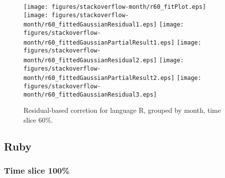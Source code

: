 \begin{figure}[t]
\centering
{}
{\texttt{[image: figures/stackoverflow-month/r60\_fitPlot.eps]}}
{\texttt{[image: figures/stackoverflow-month/r60\_fittedGaussianResidual1.eps]}}
{\texttt{[image: figures/stackoverflow-month/r60\_fittedGaussianPartialResult1.eps]}}
{\texttt{[image: figures/stackoverflow-month/r60\_fittedGaussianResidual2.eps]}}
{\texttt{[image: figures/stackoverflow-month/r60\_fittedGaussianPartialResult2.eps]}}
{\texttt{[image: figures/stackoverflow-month/r60\_fittedGaussianResidual3.eps]}}
\caption{Residual-based corretion for language R, grouped by month, time slice 60\%.}
\end{figure}


\FloatBarrier


\subsection{Ruby}

\subsubsection{Time slice 100\%}

